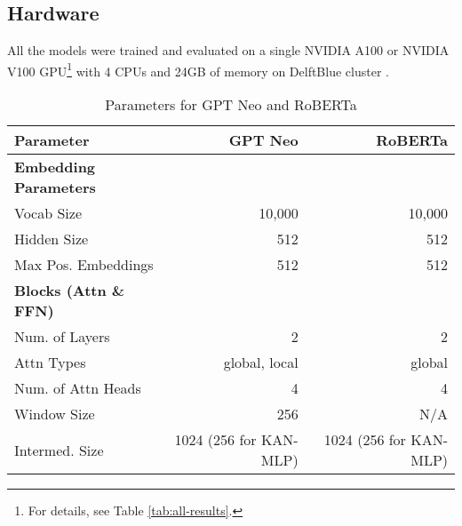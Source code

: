 \subsection{Hardware}
All the models were trained and evaluated on a single NVIDIA A100 or NVIDIA V100 GPU\footnote{For details, see Table \ref{tab:all-results}.} with 4 CPUs and 24GB of memory on DelftBlue cluster \cite{DHPC2024}.



\begin{table}[h!]
    \centering
    \scriptsize %
    \setlength{\tabcolsep}{2pt} %
    \begin{tabular}{lrr}
    \toprule
    \textbf{Parameter} & \textbf{GPT Neo} & \textbf{RoBERTa} \\ \midrule
    \textbf{Embedding Parameters} & & \\ \midrule
    Vocab Size & 10,000 & 10,000 \\ \midrule
    Hidden Size & 512 & 512 \\ \midrule
    Max Pos. Embeddings & 512 & 512 \\ \midrule
    \textbf{Blocks (Attn \& FFN)} & & \\ \midrule
    Num. of Layers & 2 & 2 \\ \midrule
    Attn Types & global, local & global \\ \midrule
    Num. of Attn Heads & 4 & 4 \\ \midrule
    Window Size & 256 & N/A \\ \midrule
    Intermed. Size & 1024 (256 for KAN-MLP) & 1024 (256 for KAN-MLP) \\ \bottomrule
    \end{tabular}
    \caption{Parameters for GPT Neo and RoBERTa}
    \label{tab:Hyperparameters}
\end{table}
